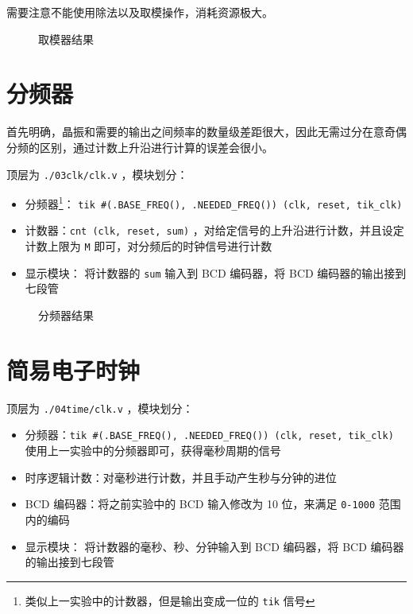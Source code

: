 \documentclass[lang=cn,11pt,a4paper,cite=authoryear]{elegantpaper}
\begin{document}
需要注意不能使用除法以及取模操作，消耗资源极大。



\begin{figure}
    \centering
    \caption{取模器结果}\label{02} 
     \hfill 
     \hfill 
     \hfill 
     \hfill 
     \hfill 
\end{figure}

\section{分频器}

首先明确，晶振和需要的输出之间频率的数量级差距很大，因此无需过分在意奇偶分频的区别，通过计数上升沿进行计算的误差会很小。

顶层为 \lstinline{./03clk/clk.v} ，模块划分：

\begin{itemize}
    \item 分频器\footnote{类似上一实验中的计数器，但是输出变成一位的 \lstinline{tik} 信号}： \lstinline{tik #(.BASE_FREQ(), .NEEDED_FREQ()) (clk, reset, tik_clk)} 
    \item 计数器：\lstinline{cnt (clk, reset, sum)} ，对给定信号的上升沿进行计数，并且设定计数上限为 \lstinline{M} 即可，对分频后的时钟信号进行计数
    \item 显示模块： 将计数器的 \lstinline{sum} 输入到 BCD 编码器，将 BCD 编码器的输出接到七段管
\end{itemize}


\begin{figure}
    \centering
    \caption{分频器结果}\label{03} 
     \hfill 
     \hfill
     \hfill 
     \bigskip 
\end{figure}

\section{简易电子时钟}


顶层为 \lstinline{./04time/clk.v} ，模块划分：

\begin{itemize}
    \item 分频器：\lstinline{tik #(.BASE_FREQ(), .NEEDED_FREQ()) (clk, reset, tik_clk)}  使用上一实验中的分频器即可，获得毫秒周期的信号
    \item 时序逻辑计数：对毫秒进行计数，并且手动产生秒与分钟的进位
    \item BCD 编码器：将之前实验中的 BCD 输入修改为 10 位，来满足 \lstinline{0-1000} 范围内的编码
    \item 显示模块： 将计数器的毫秒、秒、分钟输入到 BCD 编码器，将 BCD 编码器的输出接到七段管
\end{itemize}
\end{document}
